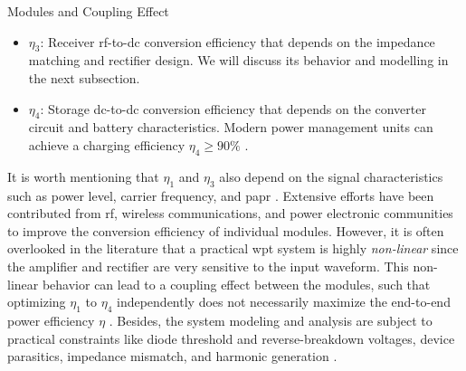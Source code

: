 \begin{section}{}
\begin{subsection}{Modules and Coupling Effect}
\begin{itemize}
			\item $\eta_3$: Receiver \gls{rf}-to-\gls{dc} conversion efficiency that depends on the impedance matching and rectifier design. We will discuss its behavior and modelling in the next subsection.
			\item $\eta_4$: Storage \gls{dc}-to-\gls{dc} conversion efficiency that depends on the converter circuit and battery characteristics. Modern power management units can achieve a charging efficiency $\eta_4 \ge 90\%$ \cite{Tan2012}.
		\end{itemize}
		It is worth mentioning that $\eta_1$ and $\eta_3$ also depend on the signal characteristics such as power level, carrier frequency, and \gls{papr} \cite{Clerckx2016a}.
		Extensive efforts have been contributed from \gls{rf}, wireless communications, and power electronic communities to improve the conversion efficiency of individual modules.
		However, it is often overlooked in the literature that a practical \gls{wpt} system is highly \emph{non-linear} since the amplifier and rectifier are very sensitive to the input waveform.
		This non-linear behavior can lead to a {coupling effect} between the modules, such that optimizing $\eta_1$ to $\eta_4$ independently does not necessarily maximize the end-to-end power efficiency $\eta$ \cite{Clerckx2016a}.
		Besides, the system modeling and analysis are subject to practical constraints like diode threshold and reverse-breakdown voltages, device parasitics, impedance mismatch, and harmonic generation  \citep{Valenta2014}.
	\end{subsection}


\end{section}
